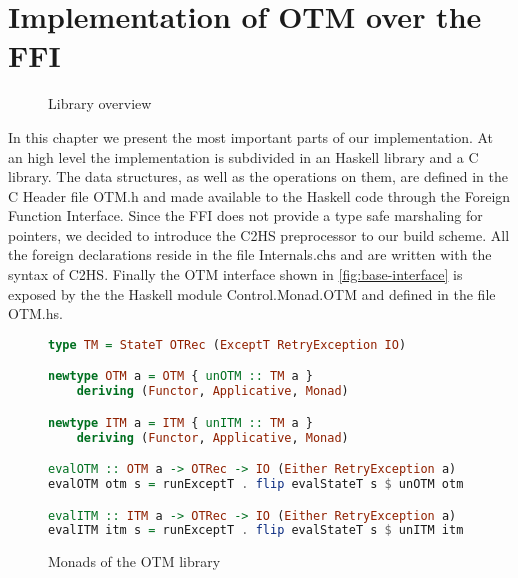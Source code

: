 
\chapter{Implementation of OTM over the FFI}

\label{chap:implementation}
\begin{wrapfigure}{r}{0.27\textwidth}
\vspace{-30pt}
\centering
    \caption{Library overview}
\end{wrapfigure}

In this chapter we present the most important parts of our implementation.
At an high level the implementation is subdivided in an Haskell library and a C library.
The data structures, as well as the operations on them, are defined in the C Header file OTM.h and made available to the Haskell code through the Foreign Function Interface.
Since the FFI does not provide a type safe marshaling for pointers, we decided to introduce the C2HS preprocessor to our build scheme.
All the foreign declarations reside in the file Internals.chs and are written with the syntax of C2HS.\cite{Chakravarty2000}
Finally the OTM interface shown in \cref{fig:base-interface} is exposed by the the Haskell module Control.Monad.OTM and defined in the file OTM.hs.

\begin{figure}[b]
\vspace{-14pt}
\begin{lstlisting}[language=Haskell]
type TM = StateT OTRec (ExceptT RetryException IO)

newtype OTM a = OTM { unOTM :: TM a }
    deriving (Functor, Applicative, Monad)

newtype ITM a = ITM { unITM :: TM a }
    deriving (Functor, Applicative, Monad)

evalOTM :: OTM a -> OTRec -> IO (Either RetryException a)
evalOTM otm s = runExceptT . flip evalStateT s $ unOTM otm

evalITM :: ITM a -> OTRec -> IO (Either RetryException a)
evalITM itm s = runExceptT . flip evalStateT s $ unITM itm
\end{lstlisting}
\caption{Monads of the OTM library}
\label{fig:monads}
\end{figure}

